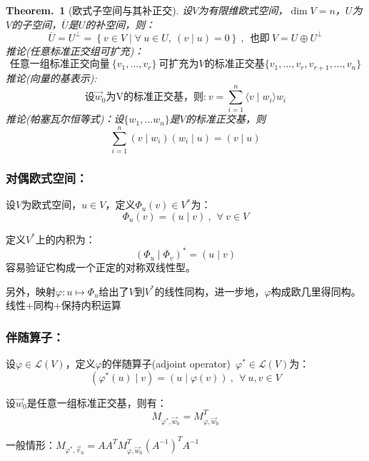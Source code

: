 \documentclass[zihao=-4,UTF8]{report}
\theoremstyle{mystyle} %
\newtheorem{theorem}{Theorem.\,}
\begin{document}
\begin{theorem}[欧式子空间与其补正交]\label{欧式子空间与其补正交}
    设$V$为有限维欧式空间，$\dim V = n$，$U$为$V$的子空间，$\overline{U}$是$U$的补空间，则：
    \begin{equation*}
        \overline{U} = U^{\perp} = \left\{ v \in V\mid \forall \ u \in U,\ (v\mid u) = 0 \right\}\ ,\ \ \text{也即}\ V = U \oplus U^{\perp}
    \end{equation*}
    推论(任意标准正交组可扩充)：
    \begin{equation*}
        \text{任意一组标准正交向量}\ \{v_1,...,v_r \}\ \text{可扩充为$V$的标准正交基}\{v_1,...,v_r,v_{r+1},...,v_n \}
    \end{equation*}
    推论(向量的基表示): 
\begin{equation*}
    \text{设$\vec{w}_0$为V的标准正交基，则:}\ v = \sum_{i=1}^{n}\langle v \mid w_i \rangle w_i
\end{equation*}  
    推论(帕塞瓦尔恒等式)：设$\{w_1,...w_n \}$是$V$的标准正交基，则
    \begin{equation*}
        \sum_{i=1}^{n}(v\mid w_i)(w_i\mid u) = (v\mid u)
    \end{equation*}
\end{theorem}
\subsubsection{对偶欧式空间：}
设$V$为欧式空间，$u \in V$，定义$\varPhi_u(v) \in V^*$为：
\begin{equation*}
    \varPhi_u(v) = (u\mid v)\ ,\ \ \forall\ v \in V
\end{equation*}\par
定义$V^*$上的内积为：
\begin{equation*}
    (\varPhi_u \mid \varPhi_v)^* = (u\mid v)
\end{equation*}
{\color{gray}\small 容易验证它构成一个正定的对称双线性型。}\par
另外，映射$\varphi: u \longmapsto \varPhi_u$给出了$V$到$V^*$的线性同构，进一步地，$\varphi$构成欧几里得同构。{\color{gray}\small 线性+同构+保持内积运算}\par

\subsubsection{伴随算子：}
设$\varphi \in \mathscr{L}(V)$，定义$\varphi$的伴随算子(adjoint operator)\ $\varphi^* \in \mathscr{L}(V)$为：
\begin{equation*}
    \left(\varphi^*(u)\mid v\right) = (u\mid \varphi(v))\ ,\ \ \forall\ u,v \in V
\end{equation*}\par
设$\vec{w}_0$是任意一组标准正交基，则有：
\begin{equation*}
    M_{\varphi^*,\vec{w}_0} = M_{\varphi,\vec{w}_0}^T
\end{equation*}
{\par\color{gray}\small
一般情形：$M_{\varphi^*,\vec{v}_0} = AA^TM_{\varphi,\vec{w}_0}^T (A^{-1})^TA^{-1}$
\par}
\end{document}
